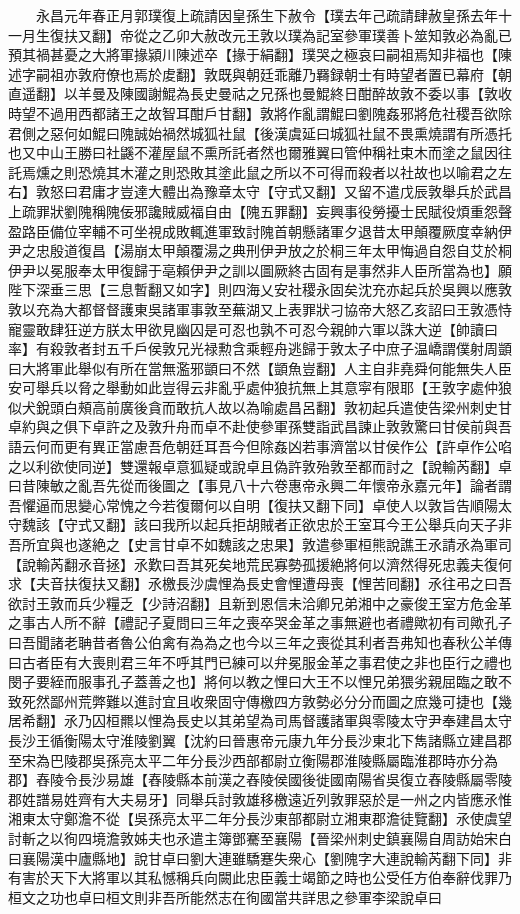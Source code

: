 　　永昌元年春正月郭璞復上疏請因皇孫生下赦令【璞去年己疏請肆赦皇孫去年十一月生復扶又翻】帝從之乙卯大赦改元王敦以璞為記室參軍璞善卜筮知敦必為亂已預其禍甚憂之大將軍掾潁川陳述卒【掾于絹翻】璞哭之極哀曰嗣祖焉知非福也【陳述字嗣祖亦敦府僚也焉於䖍翻】敦既與朝廷乖離乃羇録朝士有時望者置已幕府【朝直遥翻】以羊曼及陳國謝鯤為長史曼祜之兄孫也曼鯤終日酣醉故敦不委以事【敦收時望不過用西都諸王之故智耳酣戶甘翻】敦將作亂謂鯤曰劉隗姦邪將危社稷吾欲除君側之惡何如鯤曰隗誠始禍然城狐社鼠【後漢虞延曰城狐社鼠不畏熏燒謂有所憑托也又中山王勝曰社鼷不灌屋鼠不熏所託者然也爾雅翼曰管仲稱社束木而塗之鼠因往託焉燻之則恐燒其木灌之則恐敗其塗此鼠之所以不可得而殺者以社故也以喻君之左右】敦怒曰君庸才豈達大體出為豫章太守【守式又翻】又留不遣戊辰敦舉兵於武昌上疏罪狀劉隗稱隗佞邪讒賊威福自由【隗五罪翻】妄興事役勞擾士民賦役煩重怨聲盈路臣備位宰輔不可坐視成敗輒進軍致討隗首朝懸諸軍夕退昔太甲顛覆厥度幸納伊尹之忠殷道復昌【湯崩太甲顛覆湯之典刑伊尹放之於桐三年太甲悔過自怨自艾於桐伊尹以冕服奉太甲復歸于亳賴伊尹之訓以圖厥終古固有是事然非人臣所當為也】願陛下深垂三思【三息暫翻又如字】則四海乂安社稷永固矣沈充亦起兵於吳興以應敦敦以充為大都督督護東吳諸軍事敦至蕪湖又上表罪狀刁協帝大怒乙亥詔曰王敦憑恃寵靈敢肆狂逆方朕太甲欲見幽囚是可忍也孰不可忍今親帥六軍以誅大逆【帥讀曰率】有殺敦者封五千戶侯敦兄光禄勲含乘輕舟逃歸于敦太子中庶子温嶠謂僕射周顗曰大將軍此舉似有所在當無濫邪顗曰不然【顗魚豈翻】人主自非堯舜何能無失人臣安可舉兵以脅之舉動如此豈得云非亂乎處仲狼抗無上其意寜有限耶【王敦字處仲狼似犬銳頭白頰高前廣後貪而敢抗人故以為喻處昌呂翻】敦初起兵遣使告梁州刺史甘卓約與之俱下卓許之及敦升舟而卓不赴使參軍孫雙詣武昌諫止敦敦驚曰甘侯前與吾語云何而更有異正當慮吾危朝廷耳吾今但除姦凶若事濟當以甘侯作公【許卓作公啗之以利欲使同逆】雙還報卓意狐疑或說卓且偽許敦殆敦至都而討之【說輸芮翻】卓曰昔陳敏之亂吾先從而後圖之【事見八十六卷惠帝永興二年懷帝永嘉元年】論者謂吾懼逼而思變心常愧之今若復爾何以自明【復扶又翻下同】卓使人以敦旨告順陽太守魏該【守式又翻】該曰我所以起兵拒胡賊者正欲忠於王室耳今王公舉兵向天子非吾所宜與也遂絶之【史言甘卓不如魏該之忠果】敦遣參軍桓熊說譙王氶請氶為軍司【說輸芮翻氶音拯】氶歎曰吾其死矣地荒民寡勢孤援絶將何以濟然得死忠義夫復何求【夫音扶復扶又翻】氶檄長沙虞悝為長史會悝遭母喪【悝苦囘翻】氶往弔之曰吾欲討王敦而兵少糧乏【少詩沼翻】且新到恩信未洽卿兄弟湘中之豪俊王室方危金革之事古人所不辭【禮記子夏問曰三年之喪卒哭金革之事無避也者禮歟初有司歟孔子曰吾聞諸老聃昔者魯公伯禽有為為之也今以三年之喪從其利者吾弗知也春秋公羊傳曰古者臣有大喪則君三年不呼其門已練可以弁冕服金革之事君使之非也臣行之禮也閔子要絰而服事孔子蓋善之也】將何以教之悝曰大王不以悝兄弟猥劣親屈臨之敢不致死然鄙州荒弊難以進討宜且收衆固守傳檄四方敦勢必分分而圖之庶幾可捷也【幾居希翻】氶乃囚桓羆以悝為長史以其弟望為司馬督護諸軍與零陵太守尹奉建昌太守長沙王循衡陽太守淮陵劉翼【沈約曰晉惠帝元康九年分長沙東北下雋諸縣立建昌郡至宋為巴陵郡吳孫亮太平二年分長沙西部都尉立衡陽郡淮陵縣屬臨淮郡時亦分為郡】舂陵令長沙易雄【舂陵縣本前漢之舂陵侯國後徙國南陽省吳復立舂陵縣屬零陵郡姓譜易姓齊有大夫易牙】同舉兵討敦雄移檄遠近列敦罪惡於是一州之内皆應氶惟湘東太守鄭澹不從【吳孫亮太平二年分長沙東部都尉立湘東郡澹徒覽翻】氶使虞望討斬之以徇四境澹敦姊夫也氶遣主簿鄧騫至襄陽【晉梁州刺史鎮襄陽自周訪始宋白曰襄陽漢中廬縣地】說甘卓曰劉大連雖驕蹇失衆心【劉隗字大連說輸芮翻下同】非有害於天下大將軍以其私憾稱兵向闕此忠臣義士竭節之時也公受任方伯奉辭伐罪乃桓文之功也卓曰桓文則非吾所能然志在徇國當共詳思之參軍李梁說卓曰